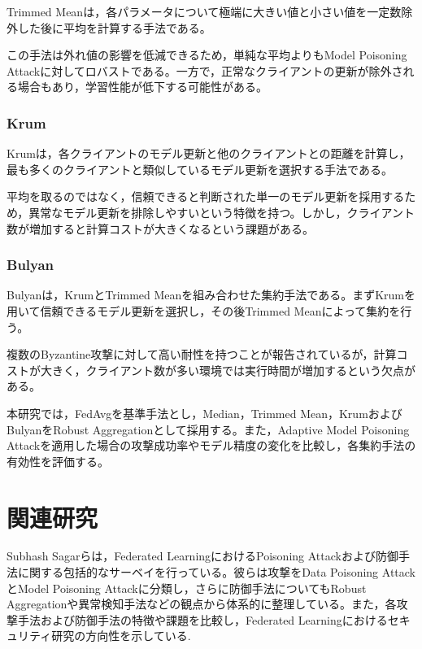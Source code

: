 \documentclass[a4j, twocolumn, dvipdfmx]{jsarticle}  %
\begin{document}
Trimmed Meanは，各パラメータについて極端に大きい値と小さい値を一定数除外した後に平均を計算する手法である。

この手法は外れ値の影響を低減できるため，単純な平均よりもModel Poisoning Attackに対してロバストである。一方で，正常なクライアントの更新が除外される場合もあり，学習性能が低下する可能性がある。

\subsubsection{Krum}

Krumは，各クライアントのモデル更新と他のクライアントとの距離を計算し，最も多くのクライアントと類似しているモデル更新を選択する手法である。

平均を取るのではなく，信頼できると判断された単一のモデル更新を採用するため，異常なモデル更新を排除しやすいという特徴を持つ。しかし，クライアント数が増加すると計算コストが大きくなるという課題がある。

\subsubsection{Bulyan}

Bulyanは，KrumとTrimmed Meanを組み合わせた集約手法である。まずKrumを用いて信頼できるモデル更新を選択し，その後Trimmed Meanによって集約を行う。

複数のByzantine攻撃に対して高い耐性を持つことが報告されているが，計算コストが大きく，クライアント数が多い環境では実行時間が増加するという欠点がある。

本研究では，FedAvgを基準手法とし，Median，Trimmed Mean，KrumおよびBulyanをRobust Aggregationとして採用する。また，Adaptive Model Poisoning Attackを適用した場合の攻撃成功率やモデル精度の変化を比較し，各集約手法の有効性を評価する。


\section{関連研究}

Subhash Sagarらは，Federated LearningにおけるPoisoning Attackおよび防御手法に関する包括的なサーベイを行っている。彼らは攻撃をData Poisoning AttackとModel Poisoning Attackに分類し，さらに防御手法についてもRobust Aggregationや異常検知手法などの観点から体系的に整理している。また，各攻撃手法および防御手法の特徴や課題を比較し，Federated Learningにおけるセキュリティ研究の方向性を示している\cite{sagar2023survey}.
\end{document}
